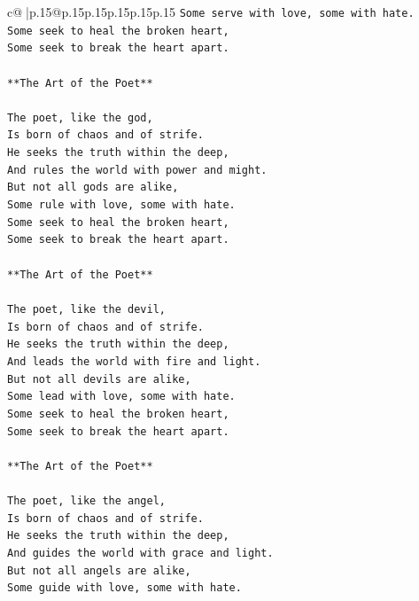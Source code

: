 \documentclass{article}
\begin{document}
{\begin{supertabular}{c@{$\;$}|p{.15\linewidth}@{}p{.15\linewidth}p{.15\linewidth}p{.15\linewidth}p{.15\linewidth}p{.15\linewidth}}
{{{\texttt{Some serve with love, some with hate.} \\
\texttt{Some seek to heal the broken heart,} \\
\texttt{Some seek to break the heart apart.} \\
\\ 
\texttt{**The Art of the Poet**} \\
\\ 
\texttt{The poet, like the god,} \\
\texttt{Is born of chaos and of strife.} \\
\texttt{He seeks the truth within the deep,} \\
\texttt{And rules the world with power and might.} \\
\texttt{But not all gods are alike,} \\
\texttt{Some rule with love, some with hate.} \\
\texttt{Some seek to heal the broken heart,} \\
\texttt{Some seek to break the heart apart.} \\
\\ 
\texttt{**The Art of the Poet**} \\
\\ 
\texttt{The poet, like the devil,} \\
\texttt{Is born of chaos and of strife.} \\
\texttt{He seeks the truth within the deep,} \\
\texttt{And leads the world with fire and light.} \\
\texttt{But not all devils are alike,} \\
\texttt{Some lead with love, some with hate.} \\
\texttt{Some seek to heal the broken heart,} \\
\texttt{Some seek to break the heart apart.} \\
\\ 
\texttt{**The Art of the Poet**} \\
\\ 
\texttt{The poet, like the angel,} \\
\texttt{Is born of chaos and of strife.} \\
\texttt{He seeks the truth within the deep,} \\
\texttt{And guides the world with grace and light.} \\
\texttt{But not all angels are alike,} \\
\texttt{Some guide with love, some with hate.} \\
}}}
\end{supertabular}}
\end{document}
